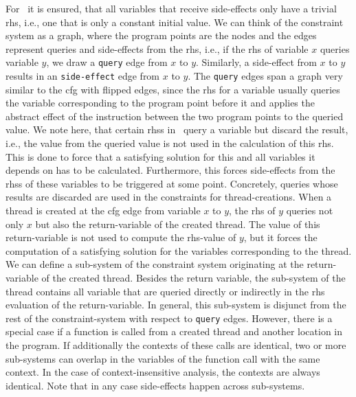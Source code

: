   For \gob\ it is ensured, that all variables that receive side-effects only have a trivial \ac{rhs}, i.e., one that is only a constant initial value.
  We can think of the constraint system as a graph, where the program points are the nodes and the edges represent queries and side-effects from the \ac{rhs}, i.e., if the \ac{rhs} of variable $x$ queries variable $y$, we draw a \texttt{query} edge from $x$ to $y$. Similarly, a side-effect from $x$ to $y$ results in an \texttt{side-effect} edge from $x$ to $y$. The \texttt{query} edges span a graph very similar to the \ac{cfg} with flipped edges, since the \ac{rhs} for a variable usually queries the variable corresponding to the program point before it and applies the abstract effect of the instruction between the two program points to the queried value.
  We note here, that certain \acp{rhs} in \gob\ query a variable but discard the result, i.e., the value from the queried value is not used in the calculation of this \ac{rhs}. This is done to force that a satisfying solution for this and all variables it depends on has to be calculated. Furthermore, this forces side-effects from the \acp{rhs} of these variables to be triggered at some point. Concretely, queries whose results are discarded are used in the constraints for thread-creations. When a thread is created at the \ac{cfg} edge from variable $x$ to $y$, the \ac{rhs} of $y$ queries not only $x$ but also the return-variable of the created thread. The value of this return-variable is not used to compute the \ac{rhs}-value of $y$, but it forces the computation of a satisfying solution for the variables corresponding to the thread.
  We can define a sub-system of the constraint system originating at the return-variable of the created thread. Besides the return variable, the sub-system of the thread contains all variable that are queried directly or indirectly in the \ac{rhs} evaluation of the return-variable. In general, this sub-system is disjunct from the rest of the constraint-system with respect to \texttt{query} edges. However, there is a special case if a function is called from a created thread and another location in the program. If additionally the contexts of these calls are identical, two or more sub-systems can overlap in the variables of the function call with the same context. In the case of context-insensitive analysis, the contexts are always identical. Note that in any case side-effects happen across sub-systems.


